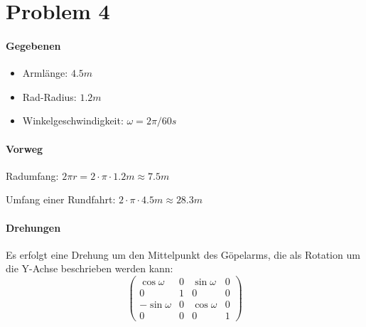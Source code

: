 \documentclass{article}
\begin{document}
\section{Problem 4}

\paragraph{Gegebenen}
\begin{itemize}
    \item{Armlänge: $4.5 m$}
    \item{Rad-Radius: $1.2 m$}
    \item{Winkelgeschwindigkeit: $\omega = 2 \pi / 60s$}
\end{itemize}

\paragraph{Vorweg}
Radumfang: $2 \pi r = 2 \cdot \pi \cdot 1.2m \approx 7.5m $

Umfang einer Rundfahrt: $ 2 \cdot \pi \cdot 4.5m \approx 28.3m $

\paragraph{Drehungen}

Es erfolgt eine Drehung um den Mittelpunkt des Göpelarms, die als Rotation um die Y-Achse beschrieben werden kann:
\[
    \begin{pmatrix}
        \cos{\omega} & 0 & \sin{\omega} & 0 \\
                   0 & 1 & 0 & 0 \\
       -\sin{\omega} & 0 & \cos{\omega} & 0 \\
                   0 & 0 & 0 & 1
    \end{pmatrix}
\]
\end{document}
